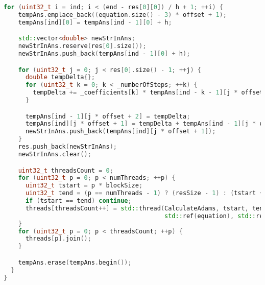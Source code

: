 \documentclass{report}
\begin{document}
\begin{lstlisting}[language=C++,caption=STL версия]
  for (uint32_t i = ind; i < (end - res[0][0]) / h + 1; ++i) {
    tempAns.emplace_back((equation.size() - 3) * offset + 1);
    tempAns[ind][0] = tempAns[ind - 1][0] + h;

    std::vector<double> newStrInAns;
    newStrInAns.reserve(res[0].size());
    newStrInAns.push_back(tempAns[ind - 1][0] + h);

    for (uint32_t j = 0; j < res[0].size() - 1; ++j) {
      double tempDelta{};
      for (uint32_t k = 0; k < _numberOfSteps; ++k) {
        tempDelta += _coefficients[k] * tempAns[ind - k - 1][j * offset + 4 + k];
      }

      tempAns[ind - 1][j * offset + 2] = tempDelta;
      tempAns[ind][j * offset + 1] = tempDelta + tempAns[ind - 1][j * offset + 1];
      newStrInAns.push_back(tempAns[ind][j * offset + 1]);
    }
    res.push_back(newStrInAns);
    newStrInAns.clear();

    uint32_t threadsCount = 0;
    for (uint32_t p = 0; p < numThreads; ++p) {
      uint32_t tstart = p * blockSize;
      uint32_t tend = (p == numThreads - 1) ? (resSize - 1) : (tstart + blockSize);
      if (tstart == tend) continue;
      threads[threadsCount++] = std::thread(CalculateAdams, tstart, tend, resSize, h, i, ind, offset, _numberOfSteps,
                                            std::ref(equation), std::ref(res), std::ref(tempAns));
    }
    for (uint32_t p = 0; p < threadsCount; ++p) {
      threads[p].join();
    }

    tempAns.erase(tempAns.begin());
  }
}
\end{lstlisting}
\end{document}
